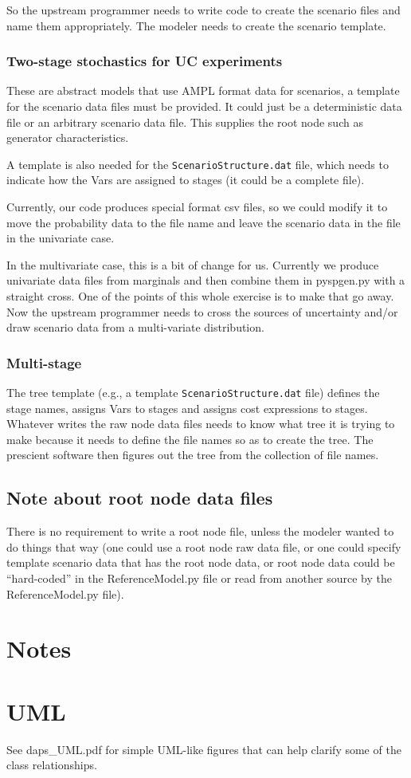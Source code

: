 \documentclass[12pt]{article}
\begin{document}
So the upstream programmer needs to write code to create the scenario files and
name them appropriately. The modeler needs to create the scenario template.

\subsubsection{Two-stage stochastics for UC experiments}

These are abstract models that use AMPL format data for scenarios, a
template for the scenario data files must be provided. It could just
be a deterministic data file or an arbitrary scenario data file. This
supplies the root node such as generator characteristics.

A template is also needed for the \verb|ScenarioStructure.dat| file,
which needs to indicate how the Vars are assigned to stages (it could
be a complete file).

Currently, our code produces special format csv files, so we could
modify it to move the probability data to the file name and leave
the scenario data in the file in the univariate case.

In the multivariate case, this is a bit of change for us. Currently
we produce univariate data files from marginals and then combine them
in pyspgen.py with a straight cross. One of the points of this
whole exercise is to make that go away. Now the upstream programmer
needs to cross the sources of uncertainty and/or draw scenario data
from a multi-variate distribution.

\subsubsection{Multi-stage}

The tree template (e.g., a template \verb|ScenarioStructure.dat| file)
defines the stage names, assigns Vars to stages and assigns cost
expressions to stages. Whatever writes the raw node data files needs
to know what tree it is trying to make because it needs to define the
file names so as to create the tree. The prescient software then
figures out the tree from the collection of file names.

\subsection{Note about root node data files}

There is no
requirement to write a root node file, unless the modeler wanted to do
things that way (one could use a root node raw data file, or one could
specify template scenario data that has the root node data, or root
node data could be ``hard-coded'' in the ReferenceModel.py file or
read from another source by the ReferenceModel.py file).

\section{Notes}

\section{UML}

See daps\_UML.pdf for simple UML-like figures that can help clarify some of the class relationships. 
\end{document}
